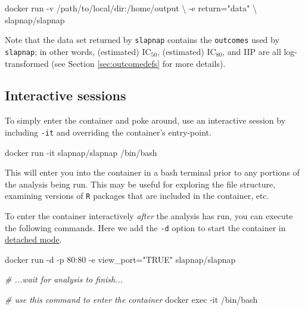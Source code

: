 \documentclass[]{article}
\newenvironment{Shaded}{\begin{snugshade}}{\end{snugshade}}
\newcommand{\StringTok}[1]{\textcolor[rgb]{0.31,0.60,0.02}{#1}}
\newcommand{\CommentTok}[1]{\textcolor[rgb]{0.56,0.35,0.01}{\textit{#1}}}
\newcommand{\ExtensionTok}[1]{#1}
\newcommand{\NormalTok}[1]{#1}
\begin{document}
\begin{Shaded}
\begin{Highlighting}[]
\ExtensionTok{docker}\NormalTok{ run -v /path/to/local/dir:/home/output \textbackslash{}}
\NormalTok{           -e return=}\StringTok{"data"}\NormalTok{ \textbackslash{}}
\NormalTok{           slapnap/slapnap}
\end{Highlighting}
\end{Shaded}

Note that the data set returned by \texttt{slapnap} contains the
\texttt{outcomes} used by \texttt{slapnap}; in other words, (estimated)
IC\(_{50}\), (estimated) IC\(_{80}\), and IIP are all log-transformed
(see Section \ref{sec:outcomedefs} for more details).

\subsection{Interactive sessions}\label{interactive-sessions}

To simply enter the container and poke around, use an interactive
session by including \texttt{-it} and overriding the container's
entry-point.

\begin{Shaded}
\begin{Highlighting}[]
\ExtensionTok{docker}\NormalTok{ run -it slapnap/slapnap /bin/bash}
\end{Highlighting}
\end{Shaded}

This will enter you into the container in a bash terminal prior to any
portions of the analysis being run. This may be useful for exploring the
file structure, examining versions of \texttt{R} packages that are
included in the container, etc.

To enter the container interactively \emph{after} the analysis has run,
you can execute the following commands. Here we add the \texttt{-d}
option to start the container in
\href{https://docs.docker.com/engine/reference/run/\#detached--d}{detached
mode}.

\begin{Shaded}
\begin{Highlighting}[]
\ExtensionTok{docker}\NormalTok{ run -d -p 80:80 -e view_port=}\StringTok{"TRUE"}\NormalTok{ slapnap/slapnap}

\CommentTok{# ...wait for analysis to finish...}

\CommentTok{# use this command to enter the container}
\ExtensionTok{docker}\NormalTok{ exec -it /bin/bash}
\end{Highlighting}
\end{Shaded}
\end{document}
